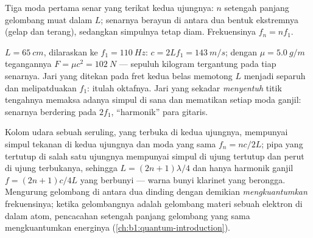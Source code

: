 \begin{omfigure}

{\small Tiga moda pertama senar yang terikat kedua ujungnya: $n$
setengah panjang gelombang muat dalam $L$; senarnya berayun di antara
dua bentuk ekstremnya (gelap dan terang), sedangkan simpulnya tetap
diam. Frekuensinya $f_n = nf_1$.}
\end{omfigure}

\begin{example}\label{ex:b1:wave-propagation:guitar}
$L = \qty{65}{cm}$, dilaraskan ke $f_1 = \qty{110}{Hz}$: $c = 2Lf_1 =
\qty{143}{m/s}$; dengan $\mu = \qty{5.0}{g/m}$ tegangannya $F = \mu c^2
= \qty{102}{N}$ --- sepuluh kilogram tergantung pada tiap senarnya. Jari
yang ditekan pada fret kedua belas memotong $L$ menjadi separuh dan
melipatduakan $f_1$: itulah oktafnya. Jari yang sekadar \emph{menyentuh}
titik tengahnya memaksa adanya simpul di sana dan mematikan setiap moda
ganjil: senarnya berdering pada $2f_1$, ``harmonik'' para gitaris.
\end{example}

\begin{remark}\label{rem:b1:wave-propagation:pipes}
Kolom udara sebuah seruling, yang terbuka di kedua ujungnya, mempunyai
simpul tekanan di kedua ujungnya dan moda yang sama $f_n = nc/2L$; pipa
yang tertutup di salah satu ujungnya mempunyai simpul di ujung tertutup
dan perut di ujung terbukanya, sehingga $L = (2n + 1)\lambda/4$ dan
hanya harmonik ganjil $f = (2n + 1)c/4L$ yang berbunyi --- warna bunyi
klarinet yang berongga. Mengurung gelombang di antara dua dinding dengan
demikian \emph{mengkuantumkan} frekuensinya; ketika gelombangnya adalah
gelombang materi sebuah elektron di dalam atom, pencacahan setengah
panjang gelombang yang sama mengkuantumkan energinya
(\cref{ch:b1:quantum-introduction}).
\end{remark}

